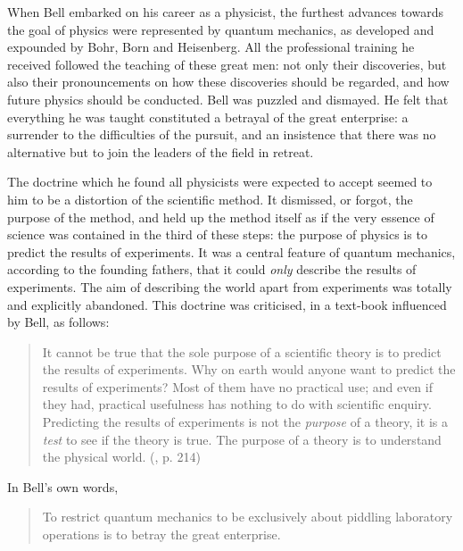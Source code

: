 \documentclass[12pt,a4paper,reqno]{article}
\renewcommand{\(}{\left(}
\renewcommand{\)}{\right)}
\renewcommand{\.}{\centerdot}
\newcommand{\1}{\mathbf{1}}
\newcommand{\<}{\langle}
\renewcommand{\>}{\rangle}
\theoremstyle{definition}
\theoremstyle{remark}
\numberwithin{equation}{section}
\begin{document}
When Bell embarked on his career as a physicist, the furthest advances towards the goal of physics were represented by quantum mechanics, as developed and expounded by Bohr, Born and Heisenberg. All the professional training he received followed the teaching of these great men: not only their discoveries, but also their pronouncements on how these discoveries should be regarded, and how future physics should be conducted. Bell was puzzled and dismayed. He felt that everything he was taught constituted a betrayal of the great enterprise: a surrender to the difficulties of the pursuit, and an insistence that there was no alternative but to join the leaders of the field in retreat.

The doctrine which he found all physicists were expected to accept seemed to him to be a distortion of the scientific method. It dismissed, or forgot, the purpose of the method, and held up the method itself as if the very essence of science was contained in the third of these steps: the purpose of physics is to predict the results of experiments. It was a central feature of quantum mechanics, according to the founding fathers, that it could \emph{only} describe the results of experiments. The aim of describing the world apart from experiments was totally and explicitly abandoned. This doctrine was criticised, in a text-book influenced by Bell, as follows:
\begin{quote}
It cannot be true that the sole purpose of a scientific theory is to predict the results of experiments. Why on earth would anyone want to predict the results of experiments? Most of them have no practical use; and even if they had, practical usefulness has nothing to do with scientific enquiry. Predicting the results of experiments is not the \emph{purpose} of a theory, it is a \emph{test} to see if the theory is true. The purpose of a theory is to understand the physical world. (\cite{QMPN}, p. 214)
\end{quote}
In Bell's own words,
\begin{quote}
To restrict quantum mechanics to be exclusively about piddling laboratory operations is to betray the great enterprise.
\end{quote}
\end{document}
